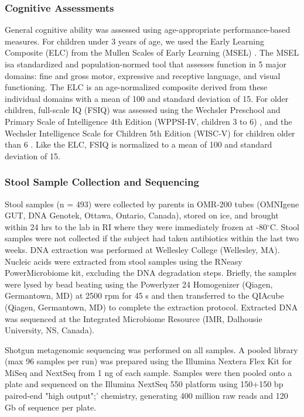 \documentclass{article}
\begin{document}
\subsubsection*{Cognitive Assessments}

General cognitive ability was assessed using age-appropriate performance-based measures.
For children under 3 years of age, we used the Early Learning
Composite (ELC) from the Mullen Scales of Early Learning (MSEL)
\cite{mullenMullenScalesEarly1995}.
The MSEL isa standardized and population-normed tool that assesses 
function in 5 major domains: fine and gross motor, expressive and receptive language,  
and visual functioning.
The ELC is an age-normalized composite derived from these individual domains
with a mean of 100 and standard deviation of 15. For older children, full-scale IQ (FSIQ)
was assessed using the Wechsler Preschool and Primary Scale of Intelligence 4th Edition
(WPPSI-IV, children 3 to 6) \cite{wechslerWechslerPreschoolPrimary2012},
and the Wechsler Intelligence Scale for Children 5th Edition (WISC-V)
for children older than 6 \cite{wechslerWechslerIntelligenceScale1949}. 
Like the ELC, FSIQ is normalized to a mean of 100 and standard deviation of 15.


\subsubsection*{Stool Sample Collection and Sequencing}

Stool samples (n = 493) were collected by parents in OMR-200 tubes
(OMNIgene GUT, DNA Genotek, Ottawa, Ontario, Canada), stored on ice, and
brought within 24 hrs to the lab in RI where they were immediately
frozen at -80$^{\circ}$C. Stool samples were not collected if the subject had
taken antibiotics within the last two weeks. DNA extraction was
performed at Wellesley College (Wellesley, MA). Nucleic acids were
extracted from stool samples using the RNeasy PowerMicrobiome kit,
excluding the DNA degradation steps. Briefly, the samples were lysed by
bead beating using the Powerlyzer 24 Homogenizer (Qiagen, Germantown,
MD) at 2500 rpm for 45 s and then transferred to the QIAcube (Qiagen,
Germantown, MD) to complete the extraction protocol. Extracted DNA was
sequenced at the Integrated Microbiome Resource (IMR, Dalhousie
University, NS, Canada).

Shotgun metagenomic sequencing was performed on all samples. A pooled
library (max 96 samples per run) was prepared using the Illumina Nextera
Flex Kit for MiSeq and NextSeq from 1 ng of each sample. Samples were
then pooled onto a plate and sequenced on the Illumina NextSeq 550
platform using 150+150 bp paired-end "high output";' chemistry,
generating 400 million raw reads and 120 Gb of sequence per plate.
\end{document}
